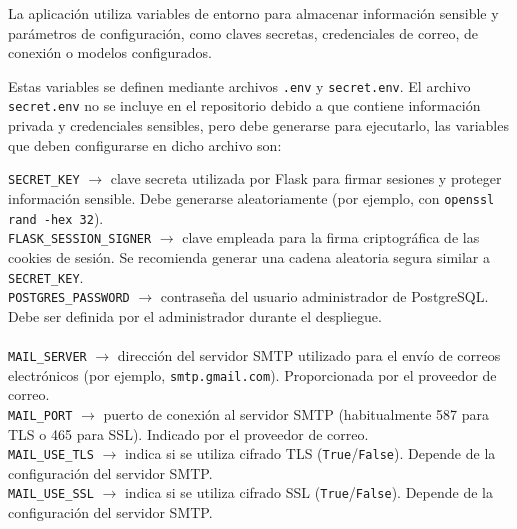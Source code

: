 La aplicación utiliza variables de entorno para almacenar información sensible y parámetros de configuración, como claves secretas, credenciales de correo,  de conexión o modelos  configurados.

Estas variables se definen mediante archivos \texttt{.env} y \texttt{secret.env}. El archivo \texttt{secret.env} no se incluye en el repositorio debido a que contiene información privada y credenciales sensibles, pero debe generarse para ejecutarlo, las variables que deben configurarse en dicho archivo son:

\begin{tcolorbox}[
	colback=yellow!8,
	colframe=orange!60!black,
	title=secret.env,
	fonttitle=\bfseries,
	breakable
]
	{\footnotesize
		\noindent
		\texttt{SECRET\_KEY} $\rightarrow$ clave secreta utilizada por Flask para firmar sesiones y proteger información sensible. Debe generarse aleatoriamente (por ejemplo, con \texttt{openssl rand -hex 32}).\\
		
		\texttt{FLASK\_SESSION\_SIGNER} $\rightarrow$ clave empleada para la firma criptográfica de las cookies de sesión. Se recomienda generar una cadena aleatoria segura similar a \texttt{SECRET\_KEY}.\\
		
		\texttt{POSTGRES\_PASSWORD} $\rightarrow$ contraseña del usuario administrador de PostgreSQL. Debe ser definida por el administrador durante el despliegue.\\
		\\
		
		\texttt{MAIL\_SERVER} $\rightarrow$ dirección del servidor SMTP utilizado para el envío de correos electrónicos (por ejemplo, \texttt{smtp.gmail.com}). Proporcionada por el proveedor de correo.\\
		
		\texttt{MAIL\_PORT} $\rightarrow$ puerto de conexión al servidor SMTP (habitualmente 587 para TLS o 465 para SSL). Indicado por el proveedor de correo.\\
		
		\texttt{MAIL\_USE\_TLS} $\rightarrow$ indica si se utiliza cifrado TLS (\texttt{True}/\texttt{False}). Depende de la configuración del servidor SMTP.\\
		
		\texttt{MAIL\_USE\_SSL} $\rightarrow$ indica si se utiliza cifrado SSL (\texttt{True}/\texttt{False}). Depende de la configuración del servidor SMTP.\\
		
}
\end{tcolorbox}
